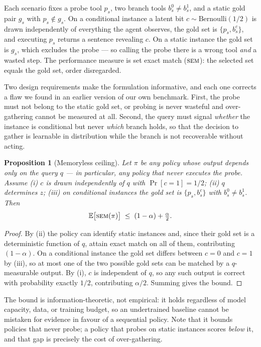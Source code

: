 \documentclass[11pt]{article}
\newtheorem{proposition}{Proposition}
\newcommand{\sem}{\ensuremath{\text{\textsc{sem}}}}
\begin{document}
Each scenario fixes a probe tool $p_s$, two branch tools $b_s^0 \neq b_s^1$, and a
static gold pair $g_s$ with $p_s \notin g_s$. On a conditional instance a latent
bit $c \sim \mathrm{Bernoulli}(1/2)$ is drawn independently of everything the agent
observes, the gold set is $\{p_s, b_s^c\}$, and executing $p_s$ returns a sentence
revealing $c$. On a static instance the gold set is $g_s$, which excludes the probe
--- so calling the probe there is a wrong tool \emph{and} a wasted step. The
performance measure is set exact match (\sem): the selected set equals the
gold set, order disregarded.

Two design requirements make the formulation informative, and each one corrects a
flaw we found in an earlier version of our own benchmark. First, the probe must
not belong to the static gold set, or probing is never wasteful and over-gathering
cannot be measured at all. Second, the query must signal \emph{whether} the
instance is conditional but never \emph{which} branch holds, so that the decision
to gather is learnable in distribution while the branch is not recoverable without
acting.

\begin{proposition}[Memoryless ceiling]
\label{prop:ceiling}
Let $\pi$ be any policy whose output depends only on the query $q$ --- in
particular, any policy that never executes the probe. Assume (i) $c$ is drawn
independently of $q$ with $\Pr[c=1]=1/2$; (ii) $q$ determines $z$; (iii) on
conditional instances the gold set is $\{p_s, b_s^c\}$ with $b_s^0 \neq b_s^1$.
Then
\[
  \mathbb{E}\big[\sem(\pi)\big] \;\leq\; (1-\alpha) + \tfrac{\alpha}{2}.
\]
\end{proposition}

\begin{proof}
By (ii) the policy can identify static instances and, since their gold set is a
deterministic function of $q$, attain exact match on all of them, contributing
$(1-\alpha)$. On a conditional instance the gold set differs between $c=0$ and
$c=1$ by (iii), so at most one of the two possible gold sets can be matched by a
$q$-measurable output. By (i), $c$ is independent of $q$, so any such output is
correct with probability exactly $1/2$, contributing $\alpha/2$. Summing gives the
bound.
\end{proof}

The bound is information-theoretic, not empirical: it holds regardless of model
capacity, data, or training budget, so an undertrained baseline cannot be mistaken
for evidence in favour of a sequential policy. Note that it bounds policies that
never probe; a policy that probes on static instances scores \emph{below} it, and
that gap is precisely the cost of over-gathering.
\end{document}
